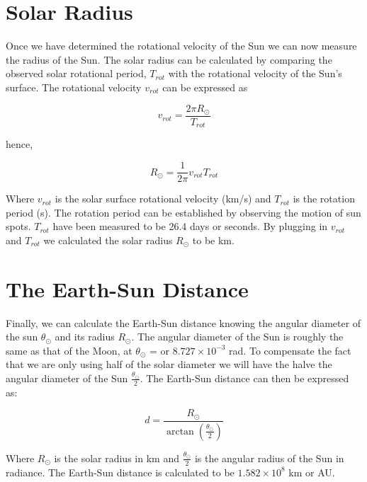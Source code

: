 \documentclass[onecolumn, 12pt, a4paper]{article}
\begin{document}
\section{Solar Radius}

Once we have determined the rotational velocity of the Sun we can now measure the radius of the Sun. The solar radius can be calculated by comparing the observed solar rotational period, $T_{rot}$ with the rotational velocity of the Sun's surface. The rotational velocity $v_{rot}$ can be expressed as 

\begin{equation}\label{eq:5}
v_{rot} = \dfrac{2\pi R_{\odot}}{T_{rot}}
\end{equation}

hence,

\begin{equation}\label{eq:6}
R_{\odot} = \dfrac{1}{2\pi} v_{rot} T_{rot}
\end{equation}
\begin{flushleft}
Where $v_{rot}$ is the solar surface rotational velocity (km/s) and $T_{rot}$ is the rotation period (s). The rotation period can be established by observing the motion of sun spots. $T_{rot}$ have been measured to be 26.4 days or  seconds. By plugging in $v_{rot}$ and  $T_{rot}$ we calculated the solar radius $R_{\odot}$ to be  km.
\end{flushleft}

\section{The Earth-Sun Distance}
Finally, we can calculate the Earth-Sun distance knowing the angular diameter of the sun $\theta_{\odot}$ and its radius $R_{\odot}$. The angular diameter of the Sun is roughly the same as that of the Moon, at $\theta_{\odot}$ =  or $8.727 \times 10^{-3}$ rad. To compensate the fact that we are only using half of the solar diameter we will have the halve the angular diameter of the Sun $\frac{\theta_{\odot}}{2}$. The Earth-Sun distance can then be expressed as:

\begin{equation}\label{eq:6}
d = \dfrac{R_{\odot}}{\arctan{(\frac{\theta_{\odot}}{2})}}
\end{equation}

\begin{flushleft}
Where $R_{\odot}$ is the solar radius in km and $\frac{\theta_{\odot}}{2}$ is the angular radius of the Sun in radiance. The Earth-Sun distance is calculated to be $1.582 \times 10^8$ km or  AU.
\end{flushleft}
\end{document}

